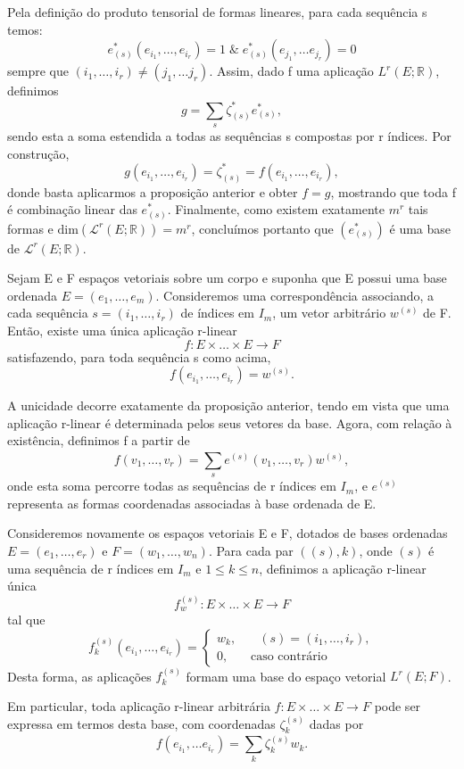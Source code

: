 \documentclass[../differential_forms.tex]{subfiles}
\begin{document}
\begin{proof*}
	Pela definição do produto tensorial de formas lineares, para cada sequência s temos:
	\[
		e_{(s)}^{*}(e_{i_1},\dotsc , e_{i_{r}})=1 \;\&\; e_{(s)}^{*}(e_{j_1},\dotsc e_{j_r})=0
	\]
	sempre que \((i_1,\dotsc ,i_{r})\neq (j_1,\dotsc j _{r})\). Assim, dado f uma aplicação \(L^{r}(E; \mathbb{R})\), definimos
	\[
		g = \sum\limits_{s}^{}\zeta_{(s)}^{*}e_{(s)}^{*},
	\]
	sendo esta a soma estendida a todas as sequências s compostas por r índices. Por construção,
	\[
		g(e_{i_1},\dotsc , e_{i_r}) = \zeta_{(s)}^{*}=f(e_{i_1},\dotsc , e_{i_r}),
	\]
	donde basta aplicarmos a proposição anterior e obter \(f=g\), mostrando que toda f é combinação linear das \(e_{(s)}^{*}.\) Finalmente, como existem exatamente \(m^{r}\) tais formas e \(\mathrm{dim}(\mathcal{L}^{r}(E; \mathbb{R}))=m^{r}\), concluímos portanto que \((e_{(s)}^{*})\) é uma base de \(\mathcal{L}^{r}(E; \mathbb{R})\). \qedsymbol
\end{proof*}
\begin{prop*}
	Sejam E e F espaços vetoriais sobre um corpo e suponha que E possui uma base ordenada \(E=(e_1,\dotsc , e_{m})\). Consideremos uma correspondência associando, a cada sequência \(s=(i_1,\dotsc ,i_r)\) de índices em \(I_{m}\), um vetor arbitrário \(w^{(s)}\) de F. Então, existe uma única aplicação r-linear
	\[
		f:E\times \dotsc \times E\rightarrow F
	\]
	satisfazendo, para toda sequência s como acima,
	\[
		f(e_{i_1}, \dotsc , e_{i_r})=w^{(s)}.
	\]
\end{prop*}
\begin{proof*}
	A unicidade decorre exatamente da proposição anterior, tendo em vista que uma aplicação r-linear é determinada pelos seus vetores da base. Agora, com relação à existência, definimos f a partir de
	\[
		f(v_1,\dotsc ,v_r)=\sum\limits_{s}^{}e^{(s)}(v_1,\dotsc , v_r)w^{(s)},
	\]
	onde esta soma percorre todas as sequências de r índices em \(I_{m}\), e \(e^{(s)}\) representa as formas coordenadas associadas à base ordenada de E. \qedsymbol
\end{proof*}
\begin{prop*}
	Consideremos novamente os espaços vetoriais E e F, dotados de bases ordenadas \(E=(e_1,\dotsc , e_r)\) e \(F=(w_1,\dotsc ,w_n)\). Para cada par \(((s), k)\), onde \((s)\) é uma sequência de r índices em \(I_{m}\) e \(1\leq k\leq n\), definimos a aplicação r-linear única
	\[
		f_{w}^{(s)}:E\times \dotsc \times E\rightarrow F
	\]
	tal que
	\[
		f_{k}^{(s)}(e_{i_1},\dotsc ,e_{i_r}) = \left\{\begin{array}{ll}
			w_k, & \quad (s)=(i_1,\dotsc ,i_r), \\
			0,   & \text{ caso contrário}
		\end{array}\right.
	\]
	Desta forma, as aplicações \(f_{k}^{(s)}\) formam uma base do espaço vetorial \(L^{r}(E; F)\).

	Em particular, toda aplicação r-linear arbitrária \(f:E\times \dotsc \times E\rightarrow F\) pode ser expressa em termos desta base, com coordenadas \(\zeta_{k}^{(s)}\) dadas por
	\[
		f(e_{i_1},\dotsc e_{i_r})=\sum\limits_{k}^{}\zeta_{k}^{(s)}w_{k}.
	\]
\end{prop*}
\end{document}
